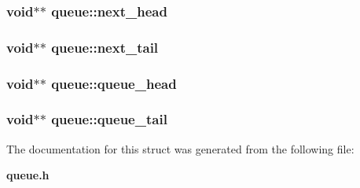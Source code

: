\subsubsection{\setlength{\rightskip}{0pt plus 5cm}void$\ast$$\ast$ \bf{queue::next\_\-head}}\label{structqueue_d55bf3049428cffcb76b46aa490dd689}


\subsubsection{\setlength{\rightskip}{0pt plus 5cm}void$\ast$$\ast$ \bf{queue::next\_\-tail}}\label{structqueue_30b9536cf9c9de0eef5266d91d4f08d2}


\subsubsection{\setlength{\rightskip}{0pt plus 5cm}void$\ast$$\ast$ \bf{queue::queue\_\-head}}\label{structqueue_0d1accf5645bdae33523de8d77e9b78d}


\subsubsection{\setlength{\rightskip}{0pt plus 5cm}void$\ast$$\ast$ \bf{queue::queue\_\-tail}}\label{structqueue_87b78ebb1770eafae99c8fa442a56b5c}




The documentation for this struct was generated from the following file:\begin{CompactItemize}
\item 
\bf{queue.h}\end{CompactItemize}
